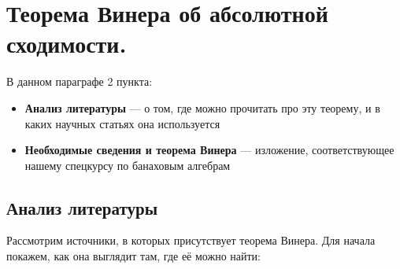 \documentclass[12pt]{extarticle}
\theoremstyle{definition}
\begin{document}
    \section[Теорема Винера.]{Теорема Винера об абсолютной сходимости.}
    В данном параграфе 2 пункта:
	\begin{itemize}
		\item \textbf{Анализ литературы} — о том, где можно прочитать про эту теорему, и в каких научных статьях она используется
		\item \textbf{Необходимые сведения и теорема Винера} — изложение, соответствующее нашему спецкурсу по банаховым алгебрам
	\end{itemize}
    \subsection{Анализ литературы}
    Рассмотрим источники, в которых присутствует теорема Винера. Для начала покажем, как она выглядит там, где её можно найти:
\end{document}
